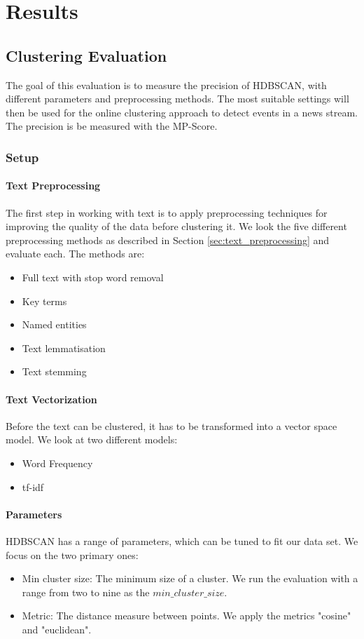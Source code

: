 \section{Results}

\subsection{Clustering Evaluation}

The goal of this evaluation is to measure the precision of HDBSCAN, with different parameters and preprocessing methods. The most suitable settings will then be used for the online clustering approach to detect events in a news stream. The precision is be measured with the MP-Score. 

\subsubsection{Setup}

\paragraph{Text Preprocessing}

 The first step in working with text is to apply preprocessing techniques for improving the quality of the data before clustering it. We look the five different preprocessing methods as described in Section \ref{sec:text_preprocessing} and evaluate each. The methods are:
 \begin{itemize}
     \item Full text with stop word removal
     \item Key terms
     \item Named entities
     \item Text lemmatisation
     \item Text stemming
 \end{itemize} 

\paragraph{Text Vectorization} Before the text can be clustered, it has to be transformed into a vector space model. We look at two different models:
\begin{itemize}
    \item Word Frequency
    \item tf-idf
\end{itemize}

\paragraph{Parameters} HDBSCAN has a range of parameters, which can be tuned to fit our data set. We focus on the two primary ones:
\begin{itemize}
    \item Min cluster size: The minimum size of a cluster. We run the evaluation with a range from two to nine as the $min\_cluster\_size$. 
    \item Metric: The distance measure between points. We apply the metrics "cosine" and "euclidean". 
\end{itemize}

